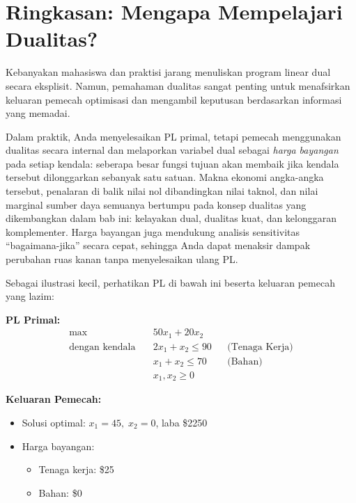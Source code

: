 \section*{Ringkasan: Mengapa Mempelajari Dualitas?}

Kebanyakan mahasiswa dan praktisi jarang menuliskan program linear dual secara eksplisit.
Namun, pemahaman dualitas sangat penting untuk menafsirkan keluaran pemecah optimisasi
dan mengambil keputusan berdasarkan informasi yang memadai.

Dalam praktik, Anda menyelesaikan PL primal, tetapi pemecah menggunakan dualitas secara internal dan melaporkan variabel dual sebagai \emph{harga bayangan} pada setiap kendala: seberapa besar fungsi tujuan akan membaik jika kendala tersebut dilonggarkan sebanyak satu satuan. Makna ekonomi angka-angka tersebut, penalaran di balik nilai nol dibandingkan nilai taknol, dan nilai marginal sumber daya semuanya bertumpu pada konsep dualitas yang dikembangkan dalam bab ini: kelayakan dual, dualitas kuat, dan kelonggaran komplementer. Harga bayangan juga mendukung analisis sensitivitas ``bagaimana-jika'' secara cepat, sehingga Anda dapat menaksir dampak perubahan ruas kanan tanpa menyelesaikan ulang PL.

Sebagai ilustrasi kecil, perhatikan PL di bawah ini beserta keluaran pemecah yang lazim:

\medskip

\begin{minipage}{\textwidth}
\textbf{PL Primal:}
\[
\begin{aligned}
\max\quad & 50x_1 + 20x_2 \\
\text{dengan kendala} \quad
& 2x_1 + x_2 \le 90 && \text{(Tenaga Kerja)} \\
& x_1 + x_2 \le 70 && \text{(Bahan)} \\
& x_1, x_2 \ge 0
\end{aligned}
\]
\end{minipage}
\par\medskip\noindent
\begin{minipage}{\textwidth}
\textbf{Keluaran Pemecah:}
\begin{itemize}
    \item Solusi optimal: \( x_1 = 45,\; x_2 = 0 \), laba \$2250
    \item Harga bayangan:
    \begin{itemize}
        \item Tenaga kerja: \$25
        \item Bahan: \$0
    \end{itemize}
\end{itemize}
\end{minipage}


